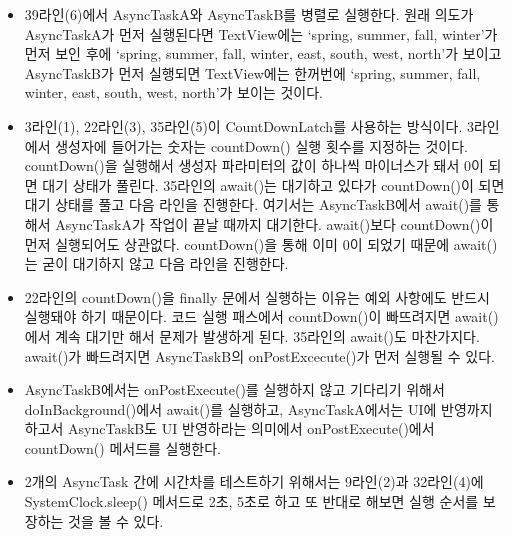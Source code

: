 \begin{itemize}
\item 39라인(6)에서 AsyncTaskA와 AsyncTaskB를 병렬로 실행한다.
원래 의도가 AsyncTaskA가 먼저 실행된다면 TextView에는 `spring, summer, fall, winter'가 먼저 보인 후에 `spring, summer, fall, winter, east, south, west, north'가 보이고
AsyncTaskB가 먼저 실행되면 TextView에는 한꺼번에 `spring, summer, fall, winter, east, south, west, north'가 보이는 것이다.

\item 3라인(1), 22라인(3), 35라인(5)이 CountDownLatch를 사용하는 방식이다. 3라인에서 생성자에 들어가는 숫자는 countDown() 실행 횟수를 지정하는 것이다.
countDown()을 실행해서 생성자 파라미터의 값이 하나씩 마이너스가 돼서 0이 되면 대기 상태가 풀린다.
35라인의 await()는 대기하고 있다가 countDown()이 되면 대기 상태를 풀고 다음 라인을 진행한다.
여기서는 AsyncTaskB에서 await()를 통해서 AsyncTaskA가 작업이 끝날 때까지 대기한다.
await()보다 countDown()이 먼저 실행되어도 상관없다. countDown()을 통해 이미  0이 되었기 때문에 await()는 굳이 대기하지 않고 다음 라인을 진행한다.

\item 22라인의 countDown()을 finally 문에서 실행하는 이유는 예외 사항에도 반드시 실행돼야 하기 때문이다.
코드 실행 패스에서 countDown()이 빠뜨려지면 await()에서 계속 대기만 해서 문제가 발생하게 된다.
35라인의 await()도 마찬가지다. await()가 빠드려지면 AsyncTaskB의 onPostExcecute()가 먼저 실행될 수 있다. 

\item AsyncTaskB에서는 onPostExecute()를 실행하지 않고 기다리기 위해서 doInBackground()에서 await()를 실행하고, AsyncTaskA에서는 UI에 반영까지 하고서 AsyncTaskB도 UI 반영하라는 의미에서 onPostExecute()에서 countDown() 메서드를 실행한다.

\item 2개의 AsyncTask 간에 시간차를 테스트하기 위해서는 9라인(2)과 32라인(4)에 SystemClock.sleep() 메서드로 2초, 5초로 하고 또 반대로 해보면 실행 순서를 보장하는 것을 볼 수 있다.
\end{itemize}

